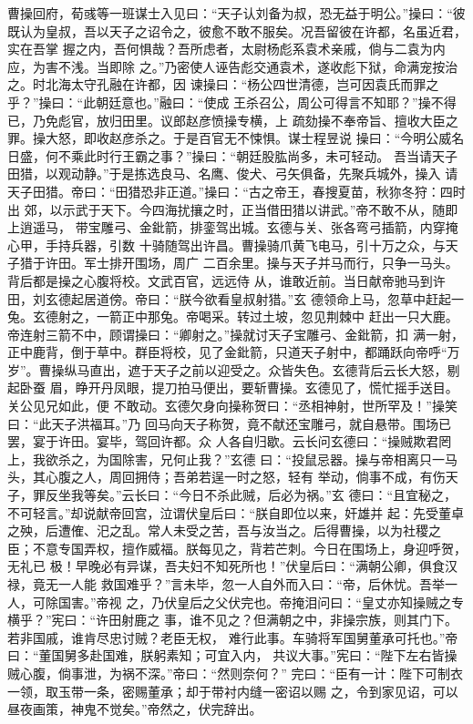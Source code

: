 曹操回府，荀彧等一班谋士入见曰：“天子认刘备为叔，恐无益于明公。”操曰：“彼
既认为皇叔，吾以天子之诏令之，彼愈不敢不服矣。况吾留彼在许都，名虽近君，实在吾掌
握之内，吾何惧哉？吾所虑者，太尉杨彪系袁术亲戚，倘与二袁为内应，为害不浅。当即除
之。”乃密使人诬告彪交通袁术，遂收彪下狱，命满宠按治之。时北海太守孔融在许都，因
谏操曰：“杨公四世清德，岂可因袁氏而罪之乎？”操曰：“此朝廷意也。”融曰：“使成
王杀召公，周公可得言不知耶？”操不得已，乃免彪官，放归田里。议郎赵彦愤操专横，上
疏劾操不奉帝旨、擅收大臣之罪。操大怒，即收赵彦杀之。于是百官无不悚惧。谋士程昱说
操曰：“今明公威名日盛，何不乘此时行王霸之事？”操曰：“朝廷股肱尚多，未可轻动。
吾当请天子田猎，以观动静。”于是拣选良马、名鹰、俊犬、弓矢俱备，先聚兵城外，操入
请天子田猎。帝曰：“田猎恐非正道。”操曰：“古之帝王，春搜夏苗，秋狝冬狩：四时出
郊，以示武于天下。今四海扰攘之时，正当借田猎以讲武。”帝不敢不从，随即上逍遥马，
带宝雕弓、金鈚箭，排銮驾出城。玄德与关、张各弯弓插箭，内穿掩心甲，手持兵器，引数
十骑随驾出许昌。曹操骑爪黄飞电马，引十万之众，与天子猎于许田。军士排开围场，周广
二百余里。操与天子并马而行，只争一马头。背后都是操之心腹将校。文武百官，远远侍
从，谁敢近前。当日献帝驰马到许田，刘玄德起居道傍。帝曰：“朕今欲看皇叔射猎。”玄
德领命上马，忽草中赶起一兔。玄德射之，一箭正中那兔。帝喝采。转过土坡，忽见荆棘中
赶出一只大鹿。帝连射三箭不中，顾谓操曰：“卿射之。”操就讨天子宝雕弓、金鈚箭，扣
满一射，正中鹿背，倒于草中。群臣将校，见了金鈚箭，只道天子射中，都踊跃向帝呼“万
岁”。曹操纵马直出，遮于天子之前以迎受之。众皆失色。玄德背后云长大怒，剔起卧蚕
眉，睁开丹凤眼，提刀拍马便出，要斩曹操。玄德见了，慌忙摇手送目。关公见兄如此，便
不敢动。玄德欠身向操称贺曰：“丞相神射，世所罕及！”操笑曰：“此天子洪福耳。”乃
回马向天子称贺，竟不献还宝雕弓，就自悬带。围场已罢，宴于许田。宴毕，驾回许都。众
人各自归歇。云长问玄德曰：“操贼欺君罔上，我欲杀之，为国除害，兄何止我？”玄德
曰：“投鼠忌器。操与帝相离只一马头，其心腹之人，周回拥侍；吾弟若逞一时之怒，轻有
举动，倘事不成，有伤天子，罪反坐我等矣。”云长曰：“今日不杀此贼，后必为祸。”玄
德曰：“且宜秘之，不可轻言。”却说献帝回宫，泣谓伏皇后曰：“朕自即位以来，奸雄并
起：先受董卓之殃，后遭傕、汜之乱。常人未受之苦，吾与汝当之。后得曹操，以为社稷之
臣；不意专国弄权，擅作威福。朕每见之，背若芒刺。今日在围场上，身迎呼贺，无礼已
极！早晚必有异谋，吾夫妇不知死所也！”伏皇后曰：“满朝公卿，俱食汉禄，竟无一人能
救国难乎？”言未毕，忽一人自外而入曰：“帝，后休忧。吾举一人，可除国害。”帝视
之，乃伏皇后之父伏完也。帝掩泪问曰：“皇丈亦知操贼之专横乎？”宪曰：“许田射鹿之
事，谁不见之？但满朝之中，非操宗族，则其门下。若非国戚，谁肯尽忠讨贼？老臣无权，
难行此事。车骑将军国舅董承可托也。”帝曰：“董国舅多赴国难，朕躬素知；可宜入内，
共议大事。”宪曰：“陛下左右皆操贼心腹，倘事泄，为祸不深。”帝曰：“然则奈何？”
完曰：“臣有一计：陛下可制衣一领，取玉带一条，密赐董承；却于带衬内缝一密诏以赐
之，令到家见诏，可以昼夜画策，神鬼不觉矣。”帝然之，伏完辞出。

